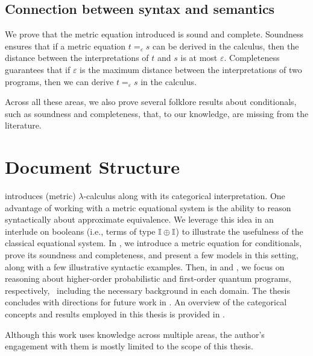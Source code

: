 \subsection*{Connection between syntax and semantics}
We prove that the metric equation introduced is sound and complete. Soundness ensures that if a metric equation $t =_{\varepsilon} s$ can be derived in the calculus, then the distance between the interpretations of $t$ and $s$ is at most $\varepsilon$. Completeness guarantees that if $\varepsilon$ is the maximum distance between the interpretations of two programs, then we can derive $t =_{\varepsilon} s$ in the calculus. 

\vspace{10pt}
Across all these areas, we also prove several folklore results about conditionals, such as soundness and completeness, that, to our knowledge, are missing from the literature.




\section{Document Structure}

 introduces (metric) $\lambda$-calculus along with its categorical interpretation. One advantage of working with a metric equational system is the ability to reason syntactically about approximate equivalence. We leverage this idea in an interlude on booleans (i.e., terms of type $\mathbb{I} \oplus \mathbb{I}$) to illustrate the usefulness of the classical equational system. In , we introduce a metric equation for conditionals, prove its soundness and completeness, and present a few models in this setting, along with a few illustrative syntactic examples. Then, in  and , we focus on reasoning about higher-order probabilistic and first-order quantum programs, respectively,  including the necessary background in each domain. The thesis concludes with directions for future work in . An overview of the categorical concepts and results employed in this thesis is provided in . 

Although this work uses knowledge across multiple areas, the author's engagement with them is mostly limited to the scope of this thesis.


